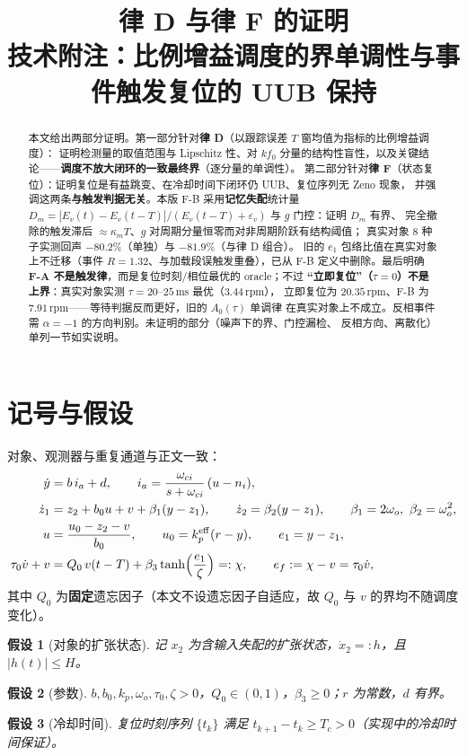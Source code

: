 \documentclass[11pt,a4paper]{article}
\title{\textbf{律 D 与律 F 的证明}\\[2mm]
\large 技术附注：比例增益调度的界单调性与事件触发复位的 UUB 保持}
\author{}
\date{}
\newtheorem{assumption}{假设}
\theoremstyle{remark}
\newcommand{\ef}{e_f}
\newcommand{\st}{\operatorname{tanh}}
\begin{document}
\maketitle

\begin{abstract}
\noindent 本文给出两部分证明。第一部分针对\textbf{律 D}（以跟踪误差 $T$ 窗均值为指标的比例增益调度）：
证明检测量的取值范围与 Lipschitz 性、对 $k f_0$ 分量的结构性盲性，以及关键结论——\textbf{调度不放大闭环的一致最终界}（逐分量的单调性）。
第二部分针对\textbf{律 F}（状态复位）：证明复位是有益跳变、在冷却时间下闭环仍 UUB、复位序列无 Zeno 现象，
并强调这两条\textbf{与触发判据无关}。本版 F-B 采用\textbf{记忆失配}统计量
$D_m=|E_v(t)-E_v(t-T)|/(E_v(t-T)+\varepsilon_v)$ 与 $g$ 门控：证明 $D_m$ 有界、
完全撤除的触发滞后 $\approx\kappa_m T$、$g$ 对周期分量恒零而对非周期阶跃有结构阈值；
真实对象 8 种子实测回声 $-80.2\%$（单独）与 $-81.9\%$（与律 D 组合）。
旧的 $e_1$ 包络比值在真实对象上不迁移（事件 $R=1.32$、与加载段误触发重叠），已从 F-B
定义中删除。最后明确 \textbf{F-A 不是触发律}，而是复位时刻/相位最优的 oracle；不过
\textbf{“立即复位”（$\tau=0$）不是上界}：真实对象实测 $\tau=20$--$25$\,ms 最优（$3.44$\,rpm），
立即复位为 $20.35$\,rpm、F-B 为 $7.91$\,rpm——等待判据反而更好，旧的 $A_0(\tau)$ 单调律
在真实对象上不成立。反相事件需 $\alpha=-1$ 的方向判别。未证明的部分（噪声下的界、门控漏检、
反相方向、离散化）单列一节如实说明。
\end{abstract}

\section{记号与假设}
对象、观测器与重复通道与正文一致：
\begin{align}
\dot y &= b\,i_a+d,\qquad i_a=\frac{\omega_{ci}}{s+\omega_{ci}}\,(u-n_i), \label{eq:plant}\\
\dot z_1 &= z_2+b_0u+v+\beta_1(y-z_1),\qquad \dot z_2=\beta_2(y-z_1),\qquad \beta_1=2\omega_o,\ \beta_2=\omega_o^2, \label{eq:eso}\\
u&=\frac{u_0-z_2-v}{b_0},\qquad u_0=k_p^{\rm eff}(r-y),\qquad e_1=y-z_1, \label{eq:law}\\
\tau_0\dot v+v&=Q_0\,v(t-T)+\beta_3\st\!\Big(\frac{e_1}{\zeta}\Big)=:\chi,\qquad \ef:=\chi-v=\tau_0\dot v, \label{eq:rc}
\end{align}
其中 $Q_0$ 为\textbf{固定}遗忘因子（本文不设遗忘因子自适应，故 $Q_0$ 与 $v$ 的界均不随调度变化）。

\begin{assumption}[对象的扩张状态]\label{as:h}
记 $x_2$ 为含输入失配的扩张状态，$\dot x_2=:h$，且 $|h(t)|\le H$。
\end{assumption}
\begin{assumption}[参数]\label{as:param}
$b,b_0,k_p,\omega_o,\tau_0,\zeta>0$，$Q_0\in(0,1)$，$\beta_3\ge0$；$r$ 为常数，$d$ 有界。
\end{assumption}
\begin{assumption}[冷却时间]\label{as:cool}
复位时刻序列 $\{t_k\}$ 满足 $t_{k+1}-t_k\ge T_c>0$（实现中的冷却时间保证）。
\end{assumption}
\end{document}
